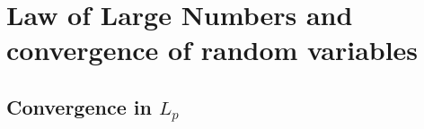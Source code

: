 

\section{Law of Large Numbers and convergence of random variables}

\subsection{Convergence in $L_p$}

